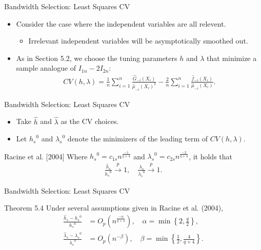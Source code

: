 \documentclass[xcolor=svgnames,dvipdfmx,cjk]{beamer}
\theoremstyle{example}
\begin{document}
\begin{frame}{Bandwidth Selection: Least Squares CV}
  \begin{itemize}
    \item Consider the case where the independent variables are all relevent.
          \begin{itemize}
            \item Irrelevant independent variables will be asymptotically smoothed out.
          \end{itemize}
    \item As in Section 5.2, 
          we choose the tuning parameters $h$ and $\lambda$ 
          that minimize a sample analogue of $I_{1n} - 2 I_{2n}$:
          \begin{align*}
            CV(h, \lambda) 
            = \frac{1}{n} \sum_{i=1}^{n} \frac{\hat{G}_{-i}(X_i)}{\hat{\mu}_{-i}(X_i)^2}
            - \frac{2}{n} \sum_{i=1}^{n} \frac{\hat{f}_{-i}(X_i)}{\hat{\mu}_{-i}(X_i)}.
          \end{align*}
  \end{itemize}
\end{frame}

\begin{frame}{Bandwidth Selection: Least Squares CV}
  \begin{itemize}
    \item Take $\hat{h}$ and $\hat{\lambda}$ as the CV choices.
    \item Let ${h_s}^0$ and ${\lambda_s}^0$ denote the minimizers of the leading term of $CV(h, \lambda)$.
  \end{itemize}
  \begin{itembox}[l]{Racine et al. [2004]}
    Where 
    ${h_s}^0 = c_{1s} n^{\frac{-1}{q+4}}$ 
    and
    ${\lambda_s}^0 = c_{2s} n^{\frac{-2}{q+4}}$,
    it holds that
    \begin{align*}
      \frac{\hat{h}_s}{{h_s}^0} \xrightarrow{p} 1, 
      \quad 
      \frac{\hat{\lambda}_s}{{\lambda_s}^0} \xrightarrow{p} 1.
    \end{align*}
  \end{itembox}
\end{frame}

\begin{frame}{Bandwidth Selection: Least Squares CV}
  \begin{itembox}[l]{Theorem 5.4}
    Under several assumptions given in Racine et al. (2004), 
    \begin{align*}
      \frac{\hat{h}_s-{h_s}^0}{{h_s}^0} 
       &= O_p \left( n^{\frac{-\alpha}{q+4}} \right),
        \quad \alpha = \min \left\{ 2, \frac{q}{2} \right\},\\
      \frac{\hat{\lambda}_s-{\lambda_s}^0}{{\lambda_s}^0} 
       &= O_p \left( n^{-\beta} \right),
        \quad \beta = \min \left\{ \frac{1}{2}, \frac{4}{q+4} \right\}.
    \end{align*}    
  \end{itembox}
\end{frame}
\end{document}
